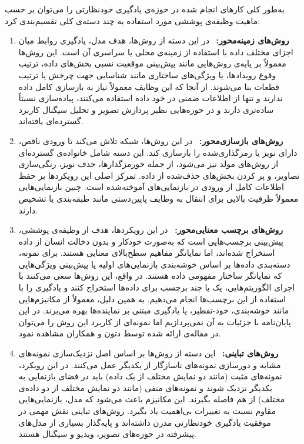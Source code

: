 به‌طور کلی کارهای انجام شده در حوزه‌ی یادگیری خودنظارتی را می‌توان بر حسب ماهیت وظیفه‌ی پوششی مورد استفاده به چند دسته‌ی کلی تقسیم‌بندی کرد:

\begin{enumerate}

\item \textbf{روش‌های زمینه‌محور:} \
در این دسته از روش‌ها، هدف مدل، یادگیری روابط میان اجزای مختلف داده با استفاده از زمینه‌ی محلی یا سراسری آن است. این روش‌ها معمولاً بر پایه‌ی روش‌هایی مانند پیش‌بینی موقعیت نسبی بخش‌های داده، ترتیب وقوع رویدادها، یا ویژگی‌های ساختاری مانند شناسایی جهت چرخش یا ترتیب قطعات بنا می‌شوند. از آنجا که این وظایف معمولاً نیاز به بازسازی کامل داده ندارند و تنها از اطلاعات ضمنی در خود داده استفاده می‌کنند، پیاده‌سازی نسبتاً ساده‌تری دارند و در حوزه‌هایی نظیر پردازش تصویر و تحلیل سیگنال کاربرد گسترده‌ای یافته‌اند.

\item \textbf{روش‌های بازسازی‌محور:} \
در این روش‌ها، شبکه تلاش می‌کند تا ورودی ناقص، دارای نویز یا رمزگذاری‌شده را بازسازی کند. این دسته شامل خانواده‌ی گسترده‌ای از روش‌های مولد
نیز می‌شود، از جمله خورمزگذارها، حذف نویز، رنگی‌سازی تصاویر، و پر کردن بخش‌های حذف‌شده از داده. تمرکز اصلی این رویکردها بر حفظ اطلاعات کامل از ورودی در بازنمایی‌های آموخته‌شده است. چنین بازنمایی‌هایی معمولاً ظرفیت بالایی برای انتقال به وظایف پایین‌دستی مانند طبقه‌بندی یا تشخیص دارند.

\item \textbf{روش‌های برچسب معنایی‌محور\LTRfootnote{Semantic Label-based}:} \
در این رویکردها، هدف از وظیفه‌ی پوششی، پیش‌بینی برچسب‌هایی است که به‌صورت خودکار و بدون دخالت انسان از داده استخراج شده‌اند، اما نمایانگر مفاهیم سطح‌بالای معنایی هستند. برای نمونه، دسته‌بندی داده‌ها بر اساس خوشه‌بندی بازنمایی‌های اولیه یا پیش‌بینی ویژگی‌هایی که نمایانگر ساختار مفهومی داده هستند. در واقع، این روش‌ها سعی می‌کنند با اجرای الگوریتم‌هایی، یک یا چند برچسب برای داده‌ها استخراج کنند و یادگیری را با استفاده از این برچسب‌ها انجام می‌دهیم. به همین دلیل، معمولاً از مکانیزم‌هایی مانند خوشه‌بندی، خود-تقطیر،
یا یادگیری مبتنی بر نماینده‌ها بهره می‌برند. در این پایان‌نامه با جزئیات به آن نمی‌پردازیم اما نمونه‌ای از کاربرد این روش را می‌توان در مقاله‌ی ارائه شده توسط دتون و همکاران\cite{detone2018superpoint}
مشاهده نمود.

\item \textbf{روش‌های تباینی:} \
این دسته از روش‌ها بر اساس اصل نزدیک‌سازی نمونه‌های مشابه و دورسازی نمونه‌های ناسازگار از یکدیگر عمل می‌کنند. در این رویکرد، نمونه‌های مثبت (مانند دو نمایش
مختلف از یک داده) باید در فضای بازنمایی به یکدیگر نزدیک شوند و نمونه‌های منفی (مانند دو نمایش مختلف از دو داده‌ی مختلف) از هم فاصله بگیرند. این مکانیزم باعث می‌شود که مدل، بازنمایی‌هایی مقاوم نسبت به تغییرات بی‌اهمیت یاد بگیرد. روش‌های تباینی نقش مهمی در موفقیت یادگیری خودنظارتی مدرن داشته‌اند و پایه‌گذار بسیاری از مدل‌های پیشرفته در حوزه‌های تصویر، ویدیو و سیگنال هستند.

\end{enumerate}

